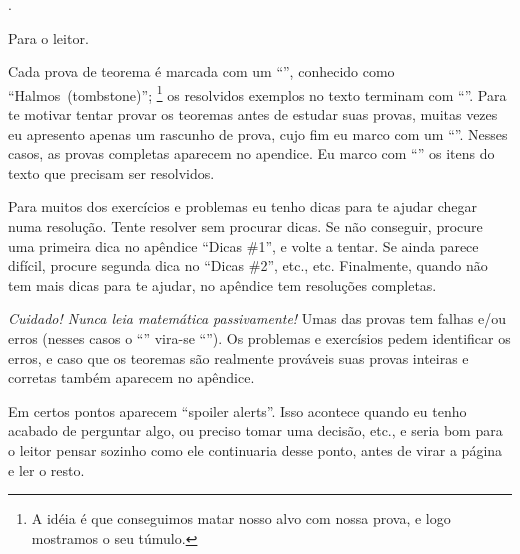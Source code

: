 
\chapteroid \prefacename.

\sectionoid Para o leitor.

Cada prova de teorema é marcada com um ``\thinspace\qedsymbol\thinspace'',
conhecido como ``Halmos\Halmos[tombstone]~(tombstone)'';%
\footnote{A idéia é que conseguimos matar nosso alvo com nossa prova,
e logo mostramos o seu túmulo.}
os resolvidos exemplos no texto terminam com
``\thinspace\qexsymbol\thinspace''.
Para te motivar tentar provar os teoremas antes de estudar suas provas,
muitas vezes eu apresento apenas um rascunho de prova,
cujo fim eu marco com um ``\thinspace\qessymbol\thinspace''.
Nesses casos, as provas completas aparecem no apendice.
Eu marco com ``\thinspace\activitysymbol\thinspace'' os itens do texto que
precisam ser resolvidos.

Para muitos dos exercícios e problemas eu tenho dicas para te ajudar
chegar numa resolução.  Tente resolver sem procurar dicas.
Se não conseguir, procure uma primeira dica no apêndice ``Dicas \#1'',
e volte a tentar.
Se ainda parece difícil, procure segunda dica no ``Dicas \#2'', etc., etc.
Finalmente, quando não tem mais dicas para te ajudar,
no apêndice tem resoluções completas.

\emph{Cuidado! Nunca leia matemática passivamente!}
Umas das provas tem falhas e/ou erros
(nesses casos o ``\thinspace\qedsymbol\thinspace''
vira-se ``\thinspace\mistakesymbol\thinspace'').
Os problemas e exercísios pedem identificar os erros,
e caso que os teoremas são realmente prováveis suas provas
inteiras e corretas também aparecem no apêndice.

Em certos pontos aparecem ``spoiler alerts''.
Isso acontece quando eu tenho acabado de perguntar algo, ou preciso
tomar uma decisão, etc., e seria bom para o leitor pensar sozinho
como ele continuaria desse ponto, antes de virar a página
e ler o resto.

\endsectionoid

\endchapteroid
